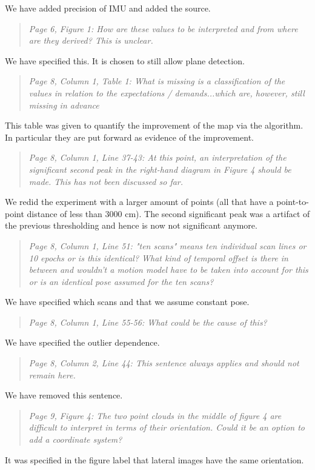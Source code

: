 \documentclass{article}
\newenvironment{itquote}
  {\begin{quote}\itshape}
  {\end{quote}\ignorespacesafterend}
\begin{document}
We have added precision of IMU and added the source.

\begin{itquote}
Page 6, Figure 1: How are these values to be interpreted and from
where are they derived? This is unclear.
\end{itquote}

We have specified this. It is chosen to still allow plane detection.

\begin{itquote}
Page 8, Column 1, Table 1: What is missing is a classification of
the values in relation to the expectations / demands...which are,
however, still missing in advance
\end{itquote}

This table was given to quantify the improvement of the map via the algorithm.
In particular they are put forward as evidence of the improvement.  

\begin{itquote}
Page 8, Column 1, Line 37-43: At this point, an interpretation of
the significant second peak in the right-hand diagram in Figure 4
should be made. This has not been discussed so far.
\end{itquote}

We redid the experiment with a larger amount of points (all that have
a point-to-point distance of less than 3000 cm). The second significant
peak was a artifact of the previous thresholding and hence is now not 
significant anymore. 

\begin{itquote}
Page 8, Column 1, Line 51: "ten scans" means ten individual scan
lines or 10 epochs or is this identical? What kind of temporal
offset is there in between and wouldn't a motion model have to be
taken into account for this or is an identical pose assumed for the
ten scans?
\end{itquote}

We have specified which scans and that we assume constant pose.

\begin{itquote}
Page 8, Column 1, Line 55-56: What could be the cause of this?
\end{itquote}

We have specified the outlier dependence.

\begin{itquote}
Page 8, Column 2, Line 44: This sentence always applies and should
not remain here.
\end{itquote}

We have removed this sentence.

\begin{itquote}
Page 9, Figure 4: The two point clouds in the middle of figure 4 are
difficult to interpret in terms of their orientation. Could it be an
option to add a coordinate system?
\end{itquote}
It was specified in the figure label that lateral images have the same
orientation.
\end{document}
